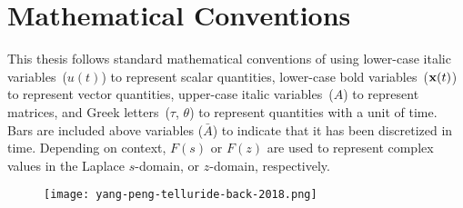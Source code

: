 \cleardoublepage
{}
\renewcommand\contentsname{Table of Contents}
\tableofcontents
\cleardoublepage
{}

\iffalse
\addcontentsline{toc}{chapter}{List of Todos}
\listoftodos
\cleardoublepage
\phantomsection
\fi

\listoftables
\cleardoublepage
{}

\listoffigures
\cleardoublepage
{}

\listoftheorems[ignoreall,show={theorem,lemma}]
\cleardoublepage
{}

\chapter*{Mathematical Conventions}
\label{typography}

This thesis follows standard mathematical conventions of using lower-case italic variables~($u(t)$) to represent scalar quantities, lower-case bold variables~($\mathbf{x}(t)$) to represent vector quantities, upper-case italic variables~($A$) to represent matrices, and Greek letters~($\tau$, $\theta$) to represent quantities with a unit of time.
Bars are included above variables ($\bar{A}$) to indicate that it has been discretized in time.
Depending on context, $F(s)$ or $F(z)$ are used to represent complex values in the Laplace $s$-domain, or $z$-domain, respectively.

\cleardoublepage
{}

\begin{figure}
\centering
\vspace*{\fill}
\begingroup
\texttt{[image: yang-peng-telluride-back-2018.png]}
\endgroup
\vspace*{\fill}
\end{figure}

\cleardoublepage
{}

